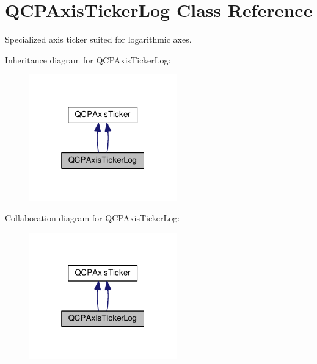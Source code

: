 \hypertarget{class_q_c_p_axis_ticker_log}{}\section{Q\+C\+P\+Axis\+Ticker\+Log Class Reference}
\label{class_q_c_p_axis_ticker_log}


Specialized axis ticker suited for logarithmic axes.  




Inheritance diagram for Q\+C\+P\+Axis\+Ticker\+Log\+:\nopagebreak
\begin{figure}[H]
\begin{center}
\leavevmode
\includegraphics[width=181pt]{class_q_c_p_axis_ticker_log__inherit__graph}
\end{center}
\end{figure}


Collaboration diagram for Q\+C\+P\+Axis\+Ticker\+Log\+:\nopagebreak
\begin{figure}[H]
\begin{center}
\leavevmode
\includegraphics[width=181pt]{class_q_c_p_axis_ticker_log__coll__graph}
\end{center}
\end{figure}
